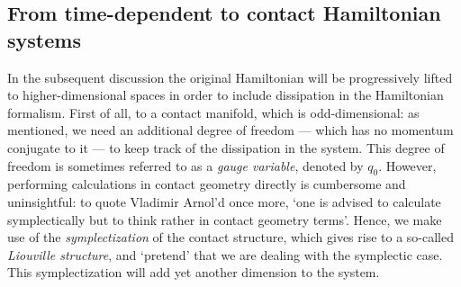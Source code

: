 %
%

\subsection{From time-dependent to contact Hamiltonian systems}
In the subsequent discussion the original Hamiltonian will be progressively lifted to higher-dimensional spaces in order to include dissipation in the Hamiltonian formalism. First of all, to a contact manifold, which is odd-dimensional: as mentioned, we need an additional degree of freedom --- which has no momentum conjugate to it --- to keep track of the dissipation in the system. This degree of freedom is sometimes referred to as a \emph{gauge variable}, denoted by $q_0$.  However, performing calculations in contact geometry directly is cumbersome and uninsightful: to quote Vladimir Arnol'd once more, `one is advised to calculate symplectically but to think rather in contact geometry terms'. Hence, we make use of the \emph{symplectization} of the contact structure, which gives rise to a so-called \emph{Liouville structure}, and `pretend' that we are dealing with the symplectic case. This symplectization will add yet another dimension to the system. \cite{VanderSchaft2021a,Arnold1989a}


